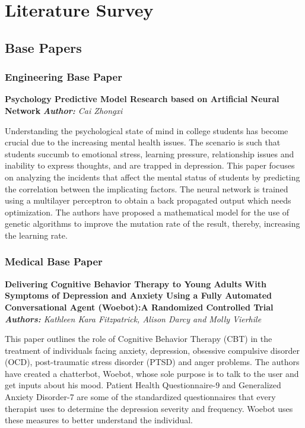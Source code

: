 \chapter{Literature Survey}

\pagebreak

\section{Base Papers}

\subsection{Engineering Base Paper}

\noindent
\textbf{Psychology Predictive Model Research based on Artificial Neural Network}
\textit{\textbf{Author:} Cai Zhongxi}

Understanding the psychological state of mind in college students has become crucial due to the increasing mental health issues. The scenario is such that students succumb to emotional stress, learning pressure, relationship issues and inability to express thoughts, and are trapped in depression. This paper focuses on analyzing the incidents that affect the mental status of students by predicting the correlation between the implicating factors. The neural network is trained using a multilayer perceptron to obtain a back propagated output which needs optimization. The authors have proposed a mathematical model for the use of genetic algorithms to improve the mutation rate of the result, thereby, increasing the learning rate.

\subsection{Medical Base Paper}

\noindent
\textbf{Delivering Cognitive Behavior Therapy to Young Adults With Symptoms of Depression and Anxiety Using a Fully Automated Conversational Agent (Woebot):A Randomized Controlled Trial}
\textit{\textbf{Authors:} Kathleen Kara Fitzpatrick, Alison Darcy and Molly Vierhile}

This paper outlines the role of Cognitive Behavior Therapy (CBT) in the treatment of individuals facing anxiety, depression, obsessive compulsive disorder (OCD), post-traumatic stress disorder (PTSD) and anger problems. The authors have created a chatterbot, Woebot, whose sole purpose is to talk to the user and get inputs about his mood. Patient Health Questionnaire-9 and Generalized Anxiety Disorder-7 are some of the standardized questionnaires that every therapist uses to determine the depression severity and frequency. Woebot uses these measures to better understand the individual.

